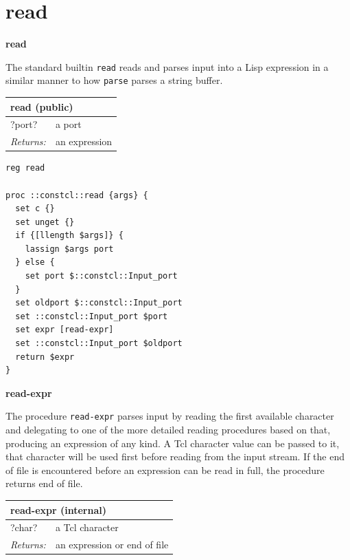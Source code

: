 \documentclass[twoside,9pt]{report}
\begin{document}
\section{read}
\label{read}

\textbf{read}


The standard builtin \texttt{read} reads and parses input into a Lisp expression in a similar manner to how \texttt{parse} parses a string buffer.

\begin{tabular}{ |l l| }
\hline
\multicolumn{2}{|l|}{read (public)} \\
\hline
?port? & a port \\
\textit{Returns:} & an expression \\
\hline
\end{tabular}

\noindent\makebox[\linewidth]{\rule{\linewidth}{0.4pt}}
\begin{lstlisting}
reg read
 
proc ::constcl::read {args} {
  set c {}
  set unget {}
  if {[llength $args]} {
    lassign $args port
  } else {
    set port $::constcl::Input_port
  }
  set oldport $::constcl::Input_port
  set ::constcl::Input_port $port
  set expr [read-expr]
  set ::constcl::Input_port $oldport
  return $expr
}
\end{lstlisting}
\noindent\makebox[\linewidth]{\rule{\linewidth}{0.4pt}}

\textbf{read-expr}


The procedure \texttt{read-expr} parses input by reading the first available character and delegating to one of the more detailed reading procedures based on that, producing an expression of any kind. A Tcl character value can be passed to it, that character will be used first before reading from the input stream. If the end of file is encountered before an expression can be read in full, the procedure returns end of file.

\begin{tabular}{ |l l| }
\hline
\multicolumn{2}{|l|}{read-expr (internal)} \\
\hline
?char? & a Tcl character \\
\textit{Returns:} & an expression or end of file \\
\hline
\end{tabular}
\end{document}

